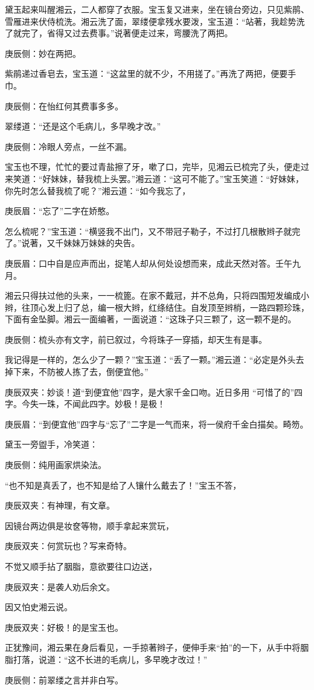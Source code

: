 \begin{parag}
    黛玉起来叫醒湘云，二人都穿了衣服。宝玉复又进来，坐在镜台旁边，只见紫鹃、雪雁进来伏侍梳洗。湘云洗了面，翠缕便拿残水要泼，宝玉道：“站著，我趁势洗了就完了，省得又过去费事。”说著便走过来，弯腰洗了两把。\begin{note}庚辰侧：妙在两把。\end{note}紫鹃递过香皂去，宝玉道：“这盆里的就不少，不用搓了。”再洗了两把，便要手巾。\begin{note}庚辰侧：在怡红何其费事多多。\end{note}翠缕道：“还是这个毛病儿，多早晚才改。”\begin{note}庚辰侧：冷眼人旁点，一丝不漏。\end{note}宝玉也不理，忙忙的要过青盐擦了牙，嗽了口，完毕，见湘云已梳完了头，便走过来笑道：“好妹妹，替我梳上头罢。”湘云道：“这可不能了。”宝玉笑道：“好妹妹，你先时怎么替我梳了呢？”湘云道：“如今我忘了，\begin{note}庚辰眉：“忘了”二字在娇憨。\end{note}怎么梳呢？”宝玉道：“横竖我不出门，又不带冠子勒子，不过打几根散辫子就完了。”说著，又千妹妹万妹妹的央告。\begin{note}庚辰眉：口中自是应声而出，捉笔人却从何处设想而来，成此天然对答。壬午九月。\end{note}湘云只得扶过他的头来，一一梳篦。在家不戴冠，并不总角，只将四围短发编成小辫，往顶心发上归了总，编一根大辫，红绦结住。自发顶至辫梢，一路四颗珍珠，下面有金坠脚。湘云一面编著，一面说道：“这珠子只三颗了，这一颗不是的。\begin{note}庚辰侧：梳头亦有文字，前已叙过，今将珠子一穿插，却天生有是事。\end{note}我记得是一样的，怎么少了一颗？”宝玉道：“丢了一颗。”湘云道：“必定是外头去掉下来，不防被人拣了去，倒便宜他。”\begin{note}庚辰双夹：妙谈！道“到便宜他”四字，是大家千金口吻。近日多用 “可惜了的”四字。今失一珠，不闻此四字。妙极！是极！\end{note}\begin{note}庚辰眉：“到便宜他”四字与“忘了”二字是一气而来，将一侯府千金白描矣。畸笏。\end{note}黛玉一旁盥手，冷笑道：\begin{note}庚辰侧：纯用画家烘染法。\end{note}“也不知是真丢了，也不知是给了人镶什么戴去了！”宝玉不答，\begin{note}庚辰双夹：有神理，有文章。\end{note}因镜台两边俱是妆奁等物，顺手拿起来赏玩，\begin{note}庚辰双夹：何赏玩也？写来奇特。\end{note}不觉又顺手拈了胭脂，意欲要往口边送，\begin{note}庚辰双夹：是袭人劝后余文。\end{note}因又怕史湘云说。\begin{note}庚辰双夹：好极！的是宝玉也。\end{note}正犹豫间，湘云果在身后看见，一手掠著辫子，便伸手来“拍”的一下，从手中将胭脂打落，说道：“这不长进的毛病儿，多早晚才改过！”\begin{note}庚辰侧：前翠缕之言并非白写。\end{note}
\end{parag}


